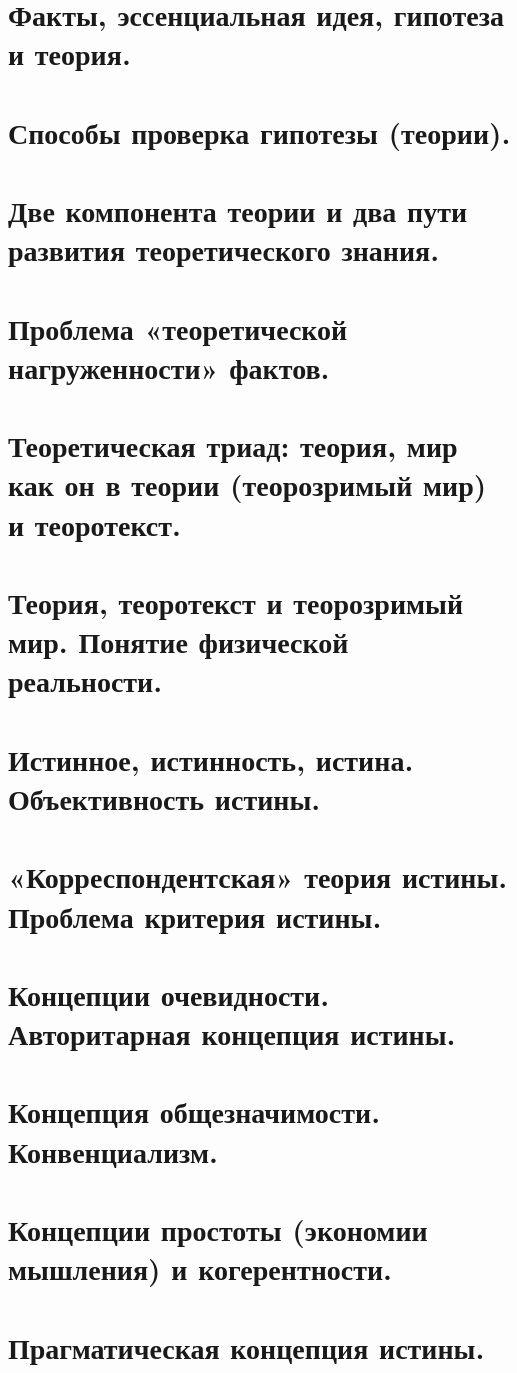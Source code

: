 \section{ Факты, эссенциальная идея, гипотеза и теория.}
\section{ Способы проверка гипотезы (теории).}
\section{ Две компонента теории и два пути развития теоретического знания.}
\section{ Проблема «теоретической нагруженности» фактов.}
\section{ Теоретическая триад: теория, мир как он в теории (теорозримый мир) и теоротекст.}
\section{ Теория, теоротекст и теорозримый мир. Понятие физической реальности.}
\section{ Истинное, истинность, истина. Объективность истины.}
\section{ «Корреспондентская» теория истины. Проблема критерия истины.}
\section{ Концепции очевидности. Авторитарная концепция истины.}
\section{ Концепция общезначимости. Конвенциализм.}
\section{ Концепции простоты (экономии мышления) и когерентности.}
\section{ Прагматическая концепция истины.}

